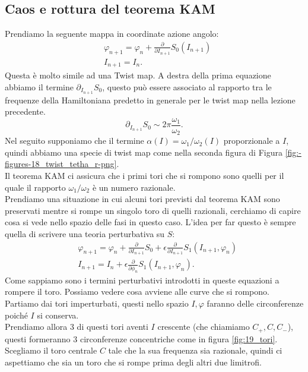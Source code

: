 \subsection{Caos e rottura del teorema KAM}%
\label{sub:Caos e rottura del teorema KAM}
Prendiamo la seguente mappa in coordinate azione angolo:
\[\begin{aligned}
    & \varphi_{n+1} = \varphi_n + \frac{\partial }{\partial I_{n+1}} S_0(I_{n+1})\\
    & I_{n+1} = I_n
.\end{aligned}\]
Questa è molto simile ad una Twist map. A destra della prima equazione abbiamo il termine $\partial_{I_{n+1}}S_0$, questo può essere associato al rapporto tra le frequenze della Hamiltoniana predetto in generale per le twist map nella lezione precedente.
\[
    \partial_{I_{n+1}}S_0 \sim 2\pi  \frac{\omega_1}{\omega_2}
.\] 
Nel seguito supponiamo che il termine $\alpha(I) = \omega_1 /\omega_2(I)$ proporzionale a $I$, quindi abbiamo una specie di twist map come nella seconda figura di Figura \ref{fig:-figures-18_twist_tetha_r-png}.\\
Il teorema KAM ci assicura che i primi tori che si rompono sono quelli per il quale il rapporto $\omega_1 /\omega_2$ è un numero razionale. \\
Prendiamo una situazione in cui alcuni tori previsti dal teorema KAM sono preservati mentre si rompe un singolo toro di quelli razionali, cerchiamo di capire cosa si vede nello spazio delle fasi in questo caso.
L'idea per far questo è sempre quella di scrivere una teoria perturbativa su $S$:
\[\begin{aligned}
     & \varphi_{n+1} = \varphi_n + \frac{\partial }{\partial I_{n+1}} S_0 + \epsilon\frac{\partial }{\partial I_{n+1}} S_1(I_{n+1}, \varphi_n)\\
     & I_{n+1} = I_n + \epsilon\frac{\partial }{\partial \phi_{n}} S_1(I_{n+1}, \varphi_n) 
.\end{aligned}\]
Come sappiamo sono i termini perturbativi introdotti in queste equazioni a rompere il toro. Possiamo vedere cosa avviene alle curve che si rompono.\\
Partiamo dai tori imperturbati, questi nello spazio $I, \varphi$ faranno delle circonferenze poiché $I$ si conserva. \\
Prendiamo allora 3 di questi tori aventi $I$ crescente (che chiamiamo $C_+, C, C_-$), questi formeranno 3 circonferenze concentriche come in figura \ref{fig:19_tori}. \\
Scegliamo il toro centrale $C$ tale che la sua frequenza sia razionale, quindi ci aspettiamo che sia un toro che si rompe prima degli altri due limitrofi.\\
